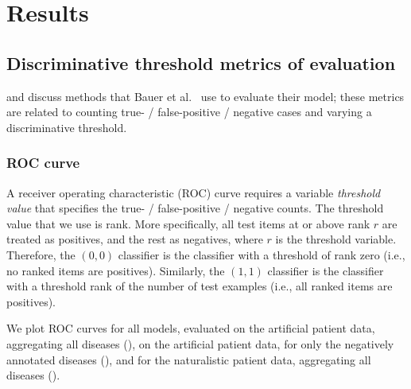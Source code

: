 \section{Results}
\label{sec:res}

\subsection{Discriminative threshold metrics of evaluation}
%
 and   discuss methods that
Bauer et al.\ \cite{bauer2012bayesian} use to evaluate their model; these metrics are related to counting 
true- / false-positive / negative cases and varying a discriminative threshold.

\subsubsection{ROC curve}
\label{subsubsec:metricroc}
%
A receiver operating characteristic (ROC) curve requires a variable {\it threshold value} that specifies
the true- / false-positive / negative counts.
%
The threshold value that we use is rank.
%
More specifically,
all test items at or above rank $r$ are treated as positives, and the rest as negatives, 
where $r$ is the threshold variable.
%
Therefore, the $(0, 0)$ classifier is the classifier with a threshold of rank zero
(i.e., no ranked items are positives).
%
Similarly,  the $(1, 1)$ classifier is the classifier with a threshold rank of the
number of test examples (i.e., all ranked items are positives).

We plot ROC curves for 
all models, evaluated on the artificial patient data,
aggregating all diseases (),
on the artificial patient data,
for only the negatively annotated diseases
(), and for the naturalistic patient data,
aggregating all diseases ().

